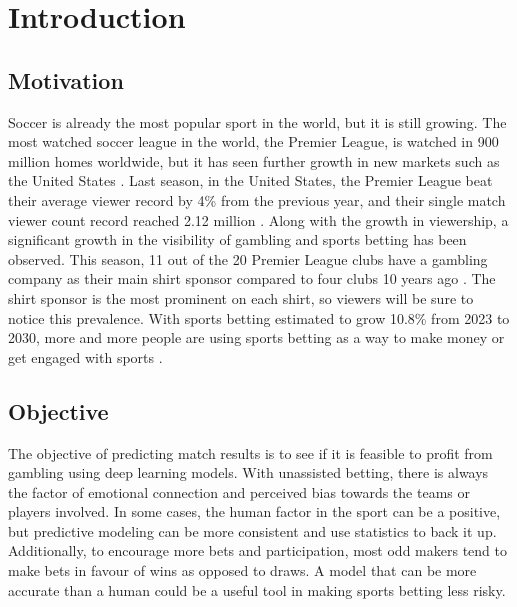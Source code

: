 \documentclass[rgb,listoffigures,listoftables,final]{cam-thesis}
\begin{document}
\frontmatter
{}

\mainmatter




\chapter{Introduction}
    \section{Motivation}
    Soccer is already the most popular sport in the world, but it is still growing. The most watched soccer league in the world, the Premier League, is watched in 900 million homes worldwide, but it has seen further growth in new markets such as the United States \cite{premwatchcount}. Last season, in the United States, the Premier League beat their average viewer record by 4\% from the previous year, and their single match viewer count record reached 2.12 million \cite{uswatchcount}. Along with the growth in viewership, a significant growth in the visibility of gambling and sports betting has been observed. This season, 11 out of the 20 Premier League clubs have a gambling company as their main shirt sponsor compared to four clubs 10 years ago \cite{shirtsponsor}. The shirt sponsor is the most prominent on each shirt, so viewers will be sure to notice this prevalence. With sports betting estimated to grow 10.8\% from 2023 to 2030, more and more people are using sports betting as a way to make money or get engaged with sports \cite{sportsbettingmarket}. 

    \section{Objective}
    The objective of predicting match results is to see if it is feasible to profit from gambling using deep learning models. With unassisted betting, there is always the factor of emotional connection and perceived bias towards the teams or players involved. In some cases, the human factor in the sport can be a positive, but predictive modeling can be more consistent and use statistics to back it up. Additionally, to encourage more bets and participation, most odd makers tend to make bets in favour of wins as opposed to draws. A model that can be more accurate than a human could be a useful tool in making sports betting less risky.
\end{document}
